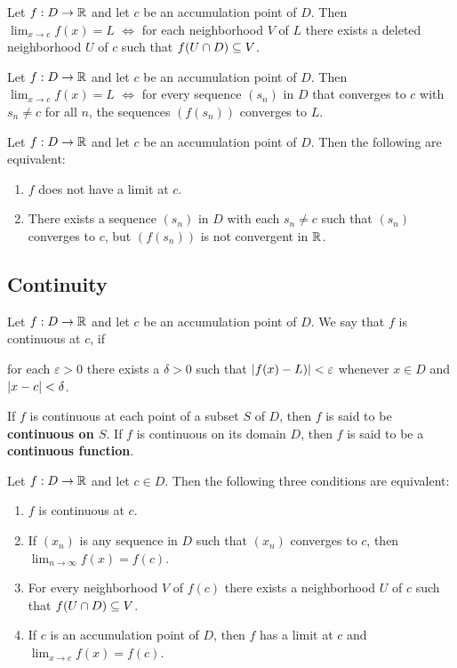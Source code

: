 \documentclass[12pt]{article}
\begin{document}
\begin{theorem}
  Let $f : D \rightarrow \mathbb{R}$ and let $c$  be an accumulation point of $D$.
  Then $\lim_{x \rightarrow c} f(x) = L$ $\iff$ for each neighborhood $V$ of $L$
  there exists a deleted neighborhood $U$ of $c$ such that $f(U \cap D) \subseteq V$.
\end{theorem}

\begin{theorem}
Let $f : D \rightarrow \mathbb{R}$ and let $c$ be an accumulation point of $D$. Then
$\lim_{x \rightarrow c} f(x) = L$ $\iff$ for every sequence $(s_n)$ in $D$ that
converges to $c$ with $s_n \ne c$ for all $n$, the sequences $(f(s_n))$
converges to $L$.
\end{theorem}

\begin{theorem}
  Let $f : D \rightarrow \mathbb{R}$ and let $c$ be an accumulation point of $D$.
  Then the following are equivalent:
  \begin{enumerate}
  \item $f$ does not have a limit at $c$.
  \item There exists a sequence $(s_n)$ in $D$ with each $s_n \ne c$ such that
    $(s_n)$ converges to $c$, but $(f(s_n))$ is not convergent in $\mathbb{R}$.
  \end{enumerate}
\end{theorem}

\subsection{Continuity}
\label{sec:orgece7594}
\begin{definition}[Continuous]
  Let $f  : D \rightarrow \mathbb{R}$  and let $c$ be  an accumulation point of  $D$. We say
  that $f$ is continuous at $c$, if
  \begin{center}
    for each $\varepsilon > 0$  there exists a $\delta > 0$ such that  $\left|f(x) - L)\right| < \varepsilon$
    whenever $x \in D$ and $\left|x - c\right| < \delta$.
  \end{center}
  If $f$ is continuous at each point of a subset $S$ of $D$, then $f$ is said
  to be \textbf{continuous on $S$}. If $f$ is continuous on its domain $D$,
  then $f$ is said to be a \textbf{continuous function}.
\end{definition}

\begin{theorem}
  Let $f : D \rightarrow \mathbb{R}$ and let $c \in D$. Then the following three
  conditions are equivalent:
  \begin{enumerate}
  \item $f$ is continuous at $c$.
  \item If $(x_n)$ is any sequence in $D$ such that $(x_n)$ converges to $c$,
    then $\lim_{n \rightarrow \infty} f(x) = f(c)$.
  \item For every neighborhood $V$ of $f(c)$ there exists a neighborhood $U$ of
    $c$ such that $f(U \cap D) \subseteq V$.
  \item If $c$ is an accumulation point of $D$, then $f$ has a limit at $c$ and
    $\lim_{x \rightarrow c} f(x) = f(c)$.
  \end{enumerate}
\end{theorem}
\end{document}
